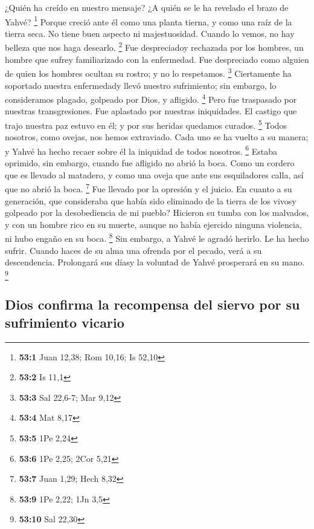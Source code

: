  ¿Quién ha creído en nuestro mensaje? ¿A quién se le ha
revelado el brazo de Yahvé? \footnote{\textbf{53:1} Juan 12,38; Rom
  10,16; Is 52,10}  Porque creció ante él como una planta
tierna, y como una raíz de la tierra seca. No tiene buen aspecto ni
majestuosidad. Cuando lo vemos, no hay belleza que nos haga desearlo.
\footnote{\textbf{53:2} Is 11,1}  Fue despreciadoy
rechazada por los hombres, un hombre que sufrey familiarizado con la
enfermedad. Fue despreciado como alguien de quien los hombres ocultan su
rostro; y no lo respetamos. \footnote{\textbf{53:3} Sal 22,6-7; Mar 9,12}
 Ciertamente ha soportado nuestra enfermedady llevó
nuestro sufrimiento; sin embargo, lo consideramos plagado, golpeado por
Dios, y afligido. \footnote{\textbf{53:4} Mat 8,17}  Pero
fue traspasado por nuestras transgresiones. Fue aplastado por nuestras
iniquidades. El castigo que trajo nuestra paz estuvo en él; y por sus
heridas quedamos curados. \footnote{\textbf{53:5} 1Pe 2,24}
 Todos nosotros, como ovejas, nos hemos extraviado. Cada
uno se ha vuelto a su manera; y Yahvé ha hecho recaer sobre él la
iniquidad de todos nosotros. \footnote{\textbf{53:6} 1Pe 2,25; 2Cor 5,21}
 Estaba oprimido, sin embargo, cuando fue afligido no
abrió la boca. Como un cordero que es llevado al matadero, y como una
oveja que ante sus esquiladores calla, así que no abrió la boca.
\footnote{\textbf{53:7} Juan 1,29; Hech 8,32}  Fue llevado
por la opresión y el juicio. En cuanto a su generación, que consideraba
que había sido eliminado de la tierra de los vivosy golpeado por la
desobediencia de mi pueblo?  Hicieron su tumba con los
malvados, y con un hombre rico en su muerte, aunque no había ejercido
ninguna violencia, ni hubo engaño en su boca. \footnote{\textbf{53:9}
  1Pe 2,22; 1Jn 3,5}  Sin embargo, a Yahvé le agradó
herirlo. Le ha hecho sufrir. Cuando haces de su alma una ofrenda por el
pecado, verá a su descendencia. Prolongará sus díasy la voluntad de
Yahvé prosperará en su mano. \footnote{\textbf{53:10} Sal 22,30}

\hypertarget{dios-confirma-la-recompensa-del-siervo-por-su-sufrimiento-vicario}{%
\subsection{Dios confirma la recompensa del siervo por su sufrimiento
vicario}\label{dios-confirma-la-recompensa-del-siervo-por-su-sufrimiento-vicario}}

